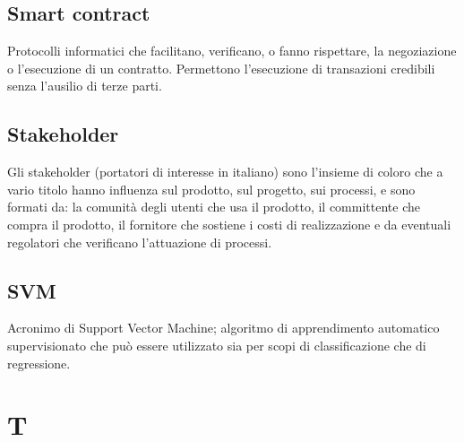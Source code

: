 \subsection*{Smart contract}
Protocolli informatici che facilitano, verificano, o fanno rispettare, la negoziazione o l'esecuzione di un contratto. Permettono l'esecuzione di transazioni credibili senza l'ausilio di terze parti.

\subsection*{Stakeholder}
Gli stakeholder (portatori di interesse in italiano) sono l’insieme di coloro che a vario titolo hanno influenza sul prodotto, sul progetto, sui processi, e sono formati da: la comunità degli utenti che usa il prodotto, il committente che compra il prodotto, il fornitore che sostiene i costi di realizzazione e da eventuali regolatori che verificano l’attuazione di processi.

\subsection*{SVM}
Acronimo di Support Vector Machine; algoritmo di apprendimento automatico supervisionato che può essere utilizzato sia per scopi di classificazione che di regressione.

\clearpage
\section*{T}




